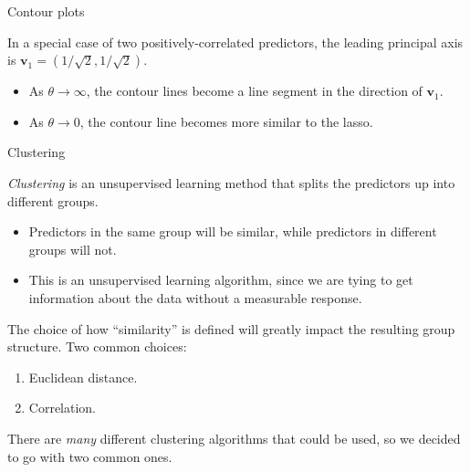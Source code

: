 \documentclass[8pt]{beamer}
\newcommand{\mys}{\vspace{0.5cm} %
}
\begin{document}
\begin{frame}[noframenumbering]{Contour plots}

\begin{center}
    \centering
    \textcolor{white}{}
    \textcolor{white}{}
\end{center}

In a special case of two positively-correlated predictors, the leading principal axis is $\bm{v}_1 = (1/\sqrt{2}, 1/\sqrt{2})$.
\begin{itemize}
    \item As $\theta \to \infty$, the contour lines become a line segment in the direction of $\bm{v}_1$.
    \item As $\theta \to 0$, the contour line becomes more similar to the lasso.
\end{itemize}
    
\end{frame}

\begin{frame}{\color{white} Clustering}

\textit{Clustering} is an unsupervised learning method that splits the predictors up into different groups.
\begin{itemize}
    \item Predictors in the same group will be similar, while predictors in different groups will not.
    \item This is an unsupervised learning algorithm, since we are tying to get information about the data without a measurable response.
\end{itemize} \mys

The choice of how ``similarity'' is defined will greatly impact the resulting group structure. Two common choices:
\begin{enumerate}
    \item Euclidean distance.
    \item Correlation.
\end{enumerate} \mys

There are \textit{many} different clustering algorithms that could be used, so we decided to go with two common ones.
    
\end{frame}
\end{document}
